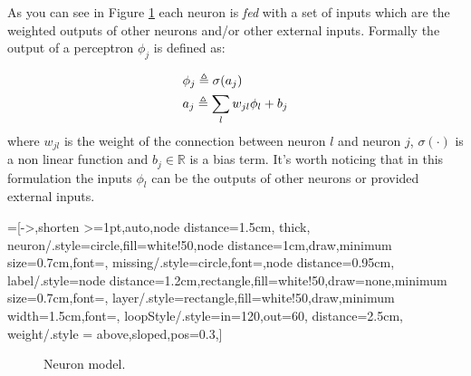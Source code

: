 As you can see in Figure \ref{neuron_model} each neuron is \textit{fed} with a set of inputs which are the weighted outputs of other neurons and/or other external inputs.
Formally the output of a perceptron $\phi_j$
is defined as:
 
\begin{align}
&\phi_j \triangleq \sigma(a_j)\label{def_perceptron_1}\\
&a_j \triangleq \sum_l w_{jl}\phi_l +b_j \label{def_perceptron_2}
\end{align}
where $w_{jl}$ is the weight of the connection between neuron $l$ and neuron $j$, $\sigma(\cdot)$ is a non linear function and $b_j \in \mathbb{R}$ is a bias term.
It's worth noticing that in this formulation the inputs $\phi_l$ can be the outputs of other neurons or provided external inputs.


=[->,shorten >=1pt,auto,node distance=1.5cm,
  thick,
  neuron/.style={circle,fill=white!50,node distance=1cm,draw,minimum size=0.7cm,font=\sffamily\normalsize},
  missing/.style={circle,font=\sffamily\Large,node distance=0.95cm},
  label/.style={node distance=1.2cm,rectangle,fill=white!50,draw=none,minimum size=0.7cm,font=\sffamily\normalsize},
  layer/.style={rectangle,fill=white!50,draw,minimum width=1.5cm,font=\sffamily\Large},
  loopStyle/.style={in=120,out=60, distance=2.5cm},
  weight/.style = {above,sloped,pos=0.3},]
\begin{figure}[h]
 \centering
{}
\caption{Neuron model.}
\label{neuron_model}
\end{figure}


